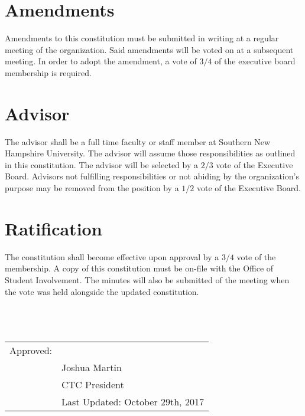 \documentclass{article}
\newcommand{\datechanged}{Last Updated: October 29th, 2017}
\newcommand{\article}[1]{\section{#1} \label{#1}}
\begin{document}
\article{Amendments}
Amendments to this constitution must be submitted in writing at a regular meeting of the organization. 
Said amendments will be voted on at a subsequent meeting. 
In order to adopt the amendment, a vote of $3/4$ of the executive board membership is required.

\article{Advisor}
The advisor shall be a full time faculty or staff member at Southern New Hampshire University. 
The advisor will assume those responsibilities as outlined in this constitution. 
The advisor will be selected by a $2/3$ vote of the Executive Board. 
Advisors not fulfilling responsibilities or not abiding by the organization's purpose may be removed from the position by a $1/2$ vote of the Executive Board.

\article{Ratification}
The constitution shall become effective upon approval by a $3/4$ vote of the membership. 
A copy of this constitution must be on-file with the Office of Student Involvement. 
The minutes will also be submitted of the meeting when the vote was held alongside the updated constitution.\\ \\ \\ \\

\begin{tabular}{@{}p{.5in}p{4in}@{}}
Approved: & \hrulefill \\
& Joshua Martin \\
& CTC President\\
& \datechanged
\end{tabular}
\end{document}
